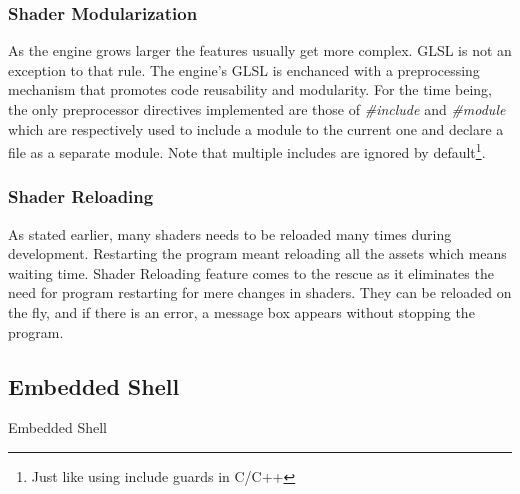 \subsubsection{Shader Modularization}
As the engine grows larger the features usually get more complex. GLSL is not an exception to that
rule. The engine's GLSL is enchanced with a preprocessing mechanism that promotes code reusability
and modularity. For the time being, the only preprocessor directives implemented are those of
\textit{\#include} and \textit{\#module} which are respectively used to include a module to the
current one and declare a file as a separate module. Note that multiple includes are ignored by
default\footnote{Just like using include guards in C/C++}.

\subsubsection{Shader Reloading}
As stated earlier, many shaders needs to be reloaded many times during development. Restarting
the program meant reloading all the assets which means waiting time. Shader Reloading feature
comes to the rescue as it eliminates the need for program restarting for mere changes in shaders.
They can be reloaded on the fly, and if there is an error, a message box appears without stopping
the program.

\subsection{Embedded Shell}
Embedded Shell
